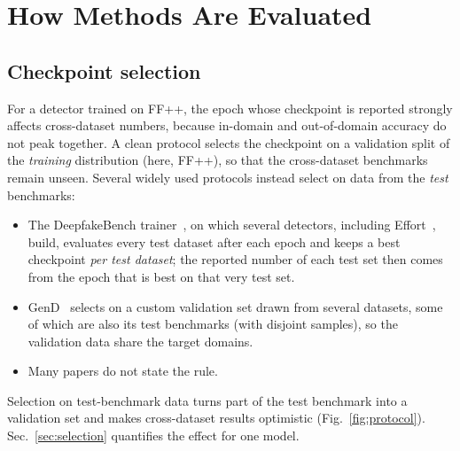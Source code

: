 \documentclass[fonts]{icst}
\begin{document}
\section{How Methods Are Evaluated}
\label{sec:eval}

\subsection{Checkpoint selection}
For a detector trained on FF++, the epoch whose checkpoint is reported strongly affects cross-dataset numbers, because in-domain and out-of-domain accuracy do not peak together. A clean protocol selects the checkpoint on a validation split of the \emph{training} distribution (here, FF++), so that the cross-dataset benchmarks remain unseen. Several widely used protocols instead select on data from the \emph{test} benchmarks:
\begin{itemize}[leftmargin=*, topsep=2pt, itemsep=2pt, label=--]
    \item The DeepfakeBench trainer~\cite{yan2023deepfakebench}, on which several detectors, including Effort~\cite{yan2025effort}, build, evaluates every test dataset after each epoch and keeps a best checkpoint \emph{per test dataset}; the reported number of each test set then comes from the epoch that is best on that very test set.
    \item GenD~\cite{yermakov2025gend} selects on a custom validation set drawn from several datasets, some of which are also its test benchmarks (with disjoint samples), so the validation data share the target domains.
    \item Many papers do not state the rule.
\end{itemize}
Selection on test-benchmark data turns part of the test benchmark into a validation set and makes cross-dataset results optimistic (Fig.~\ref{fig:protocol}). Sec.~\ref{sec:selection} quantifies the effect for one model.


\begin{table}[!t]
\centering
\caption{Video AUC of re-trained schemes under one protocol (FF++ c23 training, checkpoint selected on FF++ validation). Avg(D) and Avg(M) are mean $\pm$ std over $n$ seeds; per-dataset values are seed means. Bold: best; shaded: second best.}
\label{tab:main}
\resizebox{\textwidth}{!}{}
\end{table}
\end{document}
